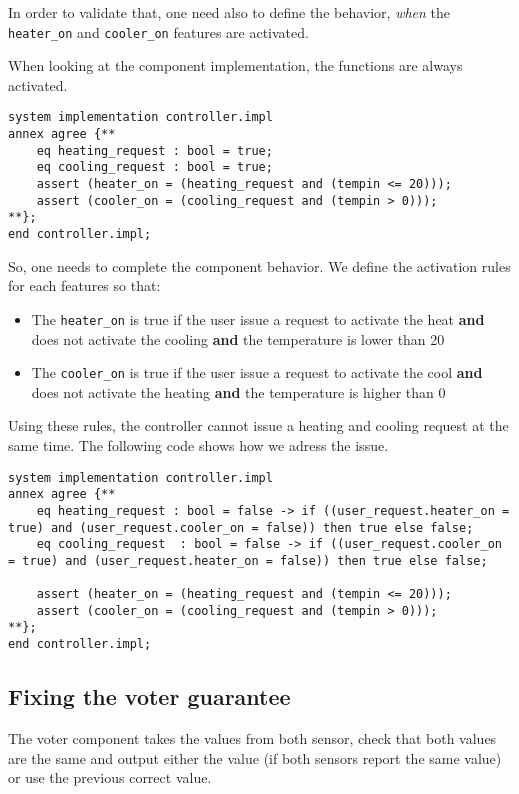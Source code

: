\documentclass[times, 10pt]{article}
\begin{document}
    In order to validate that, one need also to define the behavior,
    \textit{when} the \texttt{heater\_on} and \texttt{cooler\_on}
    features are activated.

    When looking at the component implementation, the functions
    are always activated.

\begin{lstlisting}
system implementation controller.impl
annex agree {**
	eq heating_request : bool = true;
	eq cooling_request : bool = true;
	assert (heater_on = (heating_request and (tempin <= 20)));
	assert (cooler_on = (cooling_request and (tempin > 0)));
**};
end controller.impl;
\end{lstlisting}

    So, one needs to complete the component behavior. We define
    the activation rules for each features so that:
    \begin{itemize}
        \item
            The \texttt{heater\_on} is true if the user issue a request to activate the heat \textbf{and} does not activate the cooling \textbf{and} the temperature is lower than 20
        \item
            The \texttt{cooler\_on} is true if the user issue a request to activate the cool \textbf{and} does not activate the heating \textbf{and} the temperature is higher than 0
    \end{itemize}

    Using these rules, the controller cannot issue a heating and cooling request
    at the same time. The following code shows how we adress the issue.

\begin{lstlisting}
system implementation controller.impl
annex agree {**
	eq heating_request : bool = false -> if ((user_request.heater_on = true) and (user_request.cooler_on = false)) then true else false;
	eq cooling_request  : bool = false -> if ((user_request.cooler_on = true) and (user_request.heater_on = false)) then true else false;
	
	assert (heater_on = (heating_request and (tempin <= 20)));
	assert (cooler_on = (cooling_request and (tempin > 0)));
**};
end controller.impl;
\end{lstlisting}



    \subsection{Fixing the voter guarantee}
    The voter component takes the values from both sensor, check that both
    values are the same and output either the value (if both sensors report the
    same value) or use the previous correct value.
\end{document}
